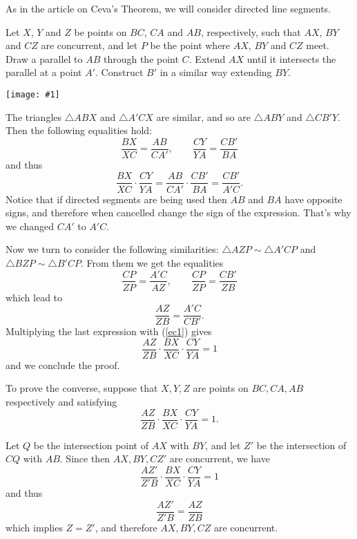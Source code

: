 \documentclass[12pt]{article}
\newcommand{\figura}[1]{\begin{center}\texttt{[image: \#1]}\end{center}}
\begin{document}

As in the article on Ceva's Theorem, we will consider directed line segments.

Let $X$, $Y$ and $Z$ be points on $BC$, $CA$ and $AB$, respectively, such that $AX$, $BY$ and $CZ$ are concurrent, and let $P$ be the point where $AX$, $BY$ and $CZ$ meet.
Draw a parallel to $AB$ through the point $C$. Extend $AX$ until it intersects the parallel at a point $A'$. Construct $B'$ in a similar way extending $BY$. \figura{ceva-proof}
The triangles $\triangle ABX$ and $\triangle A'CX$ are similar, and so are $\triangle ABY$ and $\triangle CB'Y$. Then  the following equalities hold:
$$\frac{BX}{XC}=\frac{AB}{CA'},\qquad\frac{CY}{YA}=\frac{CB'}{BA}$$
and thus 
\begin{equation}\label{ec1}
\frac{BX}{XC}\cdot\frac{CY}{YA}=\frac{AB}{CA'}\cdot\frac{CB'}{BA}=\frac{CB'}{A'C}.
\end{equation}
Notice that if directed segments are being used then $AB$ and $BA$ have opposite signs, and therefore when cancelled change the sign of the expression. That's why we changed $CA'$ to $A'C$.

Now we turn to consider the following similarities: $\triangle AZP\sim\triangle A'CP$ and $\triangle BZP\sim\triangle B'CP$. From them we get the equalities
$$\frac{CP}{ZP}=\frac{A'C}{AZ},\qquad\frac{CP}{ZP}=\frac{CB'}{ZB}$$
which lead to $$\frac{AZ}{ZB}=\frac{A'C}{CB'}.$$
Multiplying the last expression with (\ref{ec1}) gives
$$\frac{AZ}{ZB}\cdot\frac{BX}{XC}\cdot\frac{CY}{YA}=1$$
and we conclude the proof.

To prove the converse, suppose that $X,Y,Z$ are points on $BC,CA,AB$ respectively and satisfying 
$$\frac{AZ}{ZB}\cdot\frac{BX}{XC}\cdot\frac{CY}{YA}=1.$$

Let $Q$ be the intersection point of $AX$ with $BY$, and let $Z'$ be the intersection of $CQ$ with $AB$. Since then $AX,BY,CZ'$ are concurrent, we have 
$$\frac{AZ'}{Z'B}\cdot\frac{BX}{XC}\cdot\frac{CY}{YA}=1$$
and thus
$$\frac{AZ'}{Z'B}=\frac{AZ}{ZB}$$
which implies $Z=Z'$, and therefore $AX,BY,CZ$ are concurrent.
\end{document}
